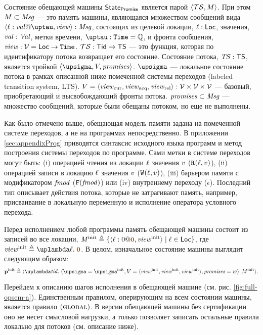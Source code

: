 Состояние обещающей машины $\mathsf{State}_{\mathsf{Promise}}$ является парой $\langle \mathcal{TS}, M \rangle$.
При этом $M\subset \mathit{Msg}$ --- это память машины, являющаяся множеством сообщений
вида  $\writeEvt{\loc}{\stval}{\tau}{\R} : \promMessageSet$, состоящих из
целевой локации, $\ell : \mathsf{Loc}$, значения, $\mathit{val} : \mathit{Val}$, метки времени, $\tau : \Timestamp = \mathbb{Q}$,
и фронта сообщения, $\mathit{view} : \mathcal{V} = \mathsf{Loc} \rightarrow \mathtt{Time}$.
$\mathcal{TS} : \mathsf{Tid} \rightarrow {\sf TS}$ --- это функция, которая по идентификатору потока возвращает его состояние.
Состояние потока, $\mathit{TS} : {\sf TS}$, является тройкой $\angled{\pstate, \V, \PromSet}$.
$\pstate$ --- локальное состояние потока в рамках описанной ниже помеченной системы переходов (labeled transition system, LTS).
$V = \langle \mathit{view}_{\mathrm{cur}},\mathit{view}_{\mathrm{acq}},\mathit{view}_{\mathrm{rel}} \rangle : \mathcal{V} \times \mathcal{V} \times \mathcal{V}$ --- базовый, приобретающий и высвобождающий
фронты потока. $\mathit{promises} \subset \mathit{Msg}$ --- множество сообщений, которые были обещаны потоком, но еще
не выполнены.

Как было отмечено выше, обещающая модель памяти задана на помеченной системе переходов, а не на программах непосредственно. 
В приложении \ref{sec:appendixProg} приводятся синтаксис исходного языка программ и метод построения системы переходов по программе.
Сами метки в системе переходов могут быть:
(i) операцией чтения из локации $\ell$ значения $v$ (${{\mathtt{R}}}^{}({\ell},{v})$),
(ii) операцией записи в локацию $\ell$ значения $v$ (${{\mathtt{W}}}^{}({\ell},{v})$),
(iii) барьером памяти с модификатором $\mathit{fmod}$ (${{\mathtt{F}}}(\mathit{fmod})$) или
(iv) внутреннему переходу ($\epsilon$). Последний тип описывает действия потока, которые не затрагивают память, например,
присваивание в локальную переменную и исполнение оператора условного перехода.

Перед исполнением любой программы память обещающей машины состоит из записей во все локации,
$\Mprom^{\rm init} \triangleq \{ \writeEvt{\loc}{0}{\tstamp{0}}{\R^{\rm init}} \mid \loc \in \Loc \}$,
где $\R^{\rm init} \triangleq \lambda \loc. \; \tstamp{0}$. В целом, изначальное состояние машины выглядит следующим образом:
\[
  \pinit \triangleq \angled{
     \lambda \tId. \; \angled{\pstate = \pstate^{\rm init},
                              \V = \angled{\R^{\rm init}, \R^{\rm init}, \R^{\rm init}}, \PromSet = \emptyset},
     \Mprom^{\rm init}}.
\]

Перейдем к описанию шагов исполнения в обещающей машине (см. рис. \ref{fig:full-opsem-a}).
Единственным правилом, оперирующим на всем состоянии машины, является правило $(\textsc{global})$.
В версии обещающей машины без сертификации \cite{Kang-al:POPL17} оно не несет смысловой нагрузки,
а только позволяет записать остальные правила локально для потоков (см. описание ниже).

